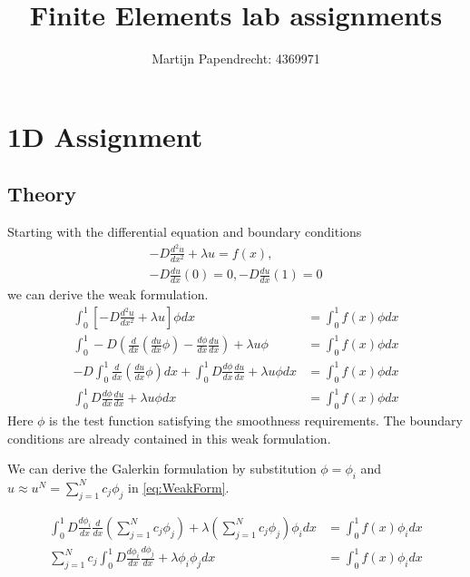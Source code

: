 \documentclass[10pt,a4paper]{article}
\title{Finite Elements lab assignments}
\author{Martijn Papendrecht: 4369971}
\begin{document}
\maketitle
\newpage
\tableofcontents
\newpage
\section{1D Assignment}
\subsection{Theory}
Starting with the differential equation and boundary conditions
\begin{equation}
\begin{split}
-D \frac{d^2u}{dx^2} + \lambda u = f(x), \\
-D \frac{du}{dx}(0) = 0, -D \frac{du}{dx}(1)=0
\end{split}
\end{equation}
we can derive the weak formulation. 
\begin{equation} 
\label{eq:WeakForm}
\begin{split}
\int_0^1 \left[ -D   \frac{d^2 u}{dx^2} + \lambda u \right] \phi dx &= \int_0^1 f(x) \phi dx \\
\int_0^1  -D \left( \frac{d}{dx} \left( \frac{du}{dx} \phi \right) - \frac{d\phi}{dx} \frac{du}{dx} \right) + \lambda u \phi &= \int_0^1 f(x) \phi dx \\
-D \int_0^1 \frac{d}{dx} \left( \frac{du}{dx} \phi \right) dx + \int_0^1 D \frac{d\phi}{dx}\frac{du}{dx} + \lambda u \phi dx &= \int_0^1 f(x) \phi dx \\
\int_0^1 D \frac{d\phi}{dx} \frac{du}{dx} + \lambda u \phi dx &= \int_0^1 f(x) \phi dx
\end{split}
\end{equation}
Here $\phi$ is the test function satisfying the smoothness requirements. 
The boundary conditions are already contained in this weak formulation.

We can derive the Galerkin formulation by substitution $\phi = \phi_i$ and $u \approx u^N = \sum_{j=1}^N c_j \phi_j$ in \cref{eq:WeakForm}.

\begin{equation} 
\begin{split}
\int_0^1 D \frac{d\phi_i}{dx} \frac{d}{dx}\left( \sum_{j=1}^N c_j \phi_j \right) + \lambda \left( \sum_{j=1}^N c_j \phi_j \right) \phi_i dx &= \int_0^1 f(x) \phi_i dx \\
\sum_{j=1}^N c_j \int_0^1 D \frac{d \phi_i}{dx} \frac{d \phi_j}{dx} + \lambda \phi_i \phi_j dx &= \int_0^1 f(x) \phi_i dx
\end{split}
\end{equation}
\end{document}
